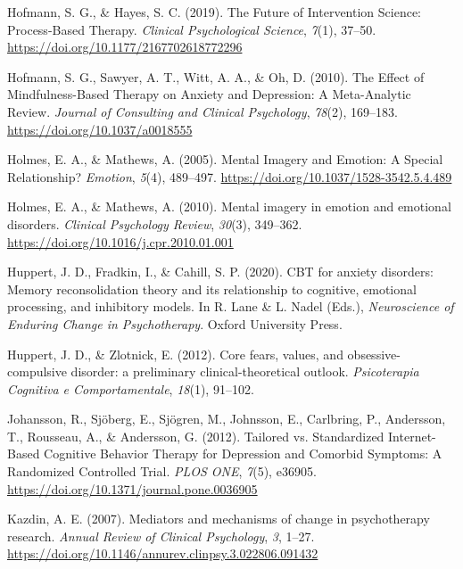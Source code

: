 \documentclass[
  man,floatsintext]{apa7}
\newlength{\cslhangindent}
\newlength{\cslentryspacingunit} %
\newenvironment{CSLReferences}[2] %
 {%
  \setlength{\parindent}{0pt}
  \ifodd #1
  \let\oldpar\par
  \def\par{\hangindent=\cslhangindent\oldpar}
  \fi
  \setlength{\parskip}{#2\cslentryspacingunit}
 }%
 {}
\begin{document}
\begin{CSLReferences}{1}{0}
\leavevmode{}%
Hofmann, S. G., \& Hayes, S. C. (2019). The Future of Intervention Science: Process-Based Therapy. \emph{Clinical Psychological Science}, \emph{7}(1), 37--50. \url{https://doi.org/10.1177/2167702618772296}

\leavevmode{}%
Hofmann, S. G., Sawyer, A. T., Witt, A. A., \& Oh, D. (2010). The Effect of Mindfulness-Based Therapy on Anxiety and Depression: A Meta-Analytic Review. \emph{Journal of Consulting and Clinical Psychology}, \emph{78}(2), 169--183. \url{https://doi.org/10.1037/a0018555}

\leavevmode{}%
Holmes, E. A., \& Mathews, A. (2005). Mental Imagery and Emotion: A Special Relationship? \emph{Emotion}, \emph{5}(4), 489--497. \url{https://doi.org/10.1037/1528-3542.5.4.489}

\leavevmode{}%
Holmes, E. A., \& Mathews, A. (2010). Mental imagery in emotion and emotional disorders. \emph{Clinical Psychology Review}, \emph{30}(3), 349--362. \url{https://doi.org/10.1016/j.cpr.2010.01.001}

\leavevmode{}%
Huppert, J. D., Fradkin, I., \& Cahill, S. P. (2020). CBT for anxiety disorders: Memory reconsolidation theory and its relationship to cognitive, emotional processing, and inhibitory models. In R. Lane \& L. Nadel (Eds.), \emph{Neuroscience of Enduring Change in Psychotherapy}. Oxford University Press.

\leavevmode{}%
Huppert, J. D., \& Zlotnick, E. (2012). Core fears, values, and obsessive-compulsive disorder: a preliminary clinical-theoretical outlook. \emph{Psicoterapia Cognitiva e Comportamentale}, \emph{18}(1), 91--102.

\leavevmode{}%
Johansson, R., Sjöberg, E., Sjögren, M., Johnsson, E., Carlbring, P., Andersson, T., Rousseau, A., \& Andersson, G. (2012). Tailored vs. Standardized Internet-Based Cognitive Behavior Therapy for Depression and Comorbid Symptoms: A Randomized Controlled Trial. \emph{PLOS ONE}, \emph{7}(5), e36905. \url{https://doi.org/10.1371/journal.pone.0036905}

\leavevmode{}%
Kazdin, A. E. (2007). Mediators and mechanisms of change in psychotherapy research. \emph{Annual Review of Clinical Psychology}, \emph{3}, 1--27. \url{https://doi.org/10.1146/annurev.clinpsy.3.022806.091432}


\end{CSLReferences}
\end{document}
